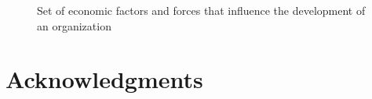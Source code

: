 \documentclass[
  ignorenonframetext,
]{beamer}
\begin{document}
\begin{frame}{}
\label{section-16}
\begin{figure}


\caption{\label{fig-econ-env-macro}Set of economic factors and forces
that influence the development of an organization}

\end{figure}%
\end{frame}

\section{Acknowledgments}\label{acknowledgments}
\end{document}
